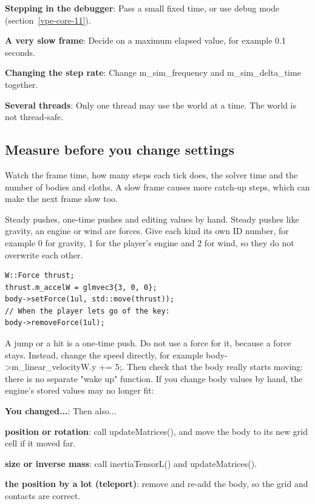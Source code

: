 \documentclass[11pt,a4paper]{article}
\begin{document}
\textbf{Stepping in the debugger}: Pass a small fixed time, or use debug mode (section~\ref{vpe-core-11}).

\textbf{A very slow frame}: Decide on a maximum elapsed value, for example 0.1 seconds.

\textbf{Changing the step rate}: Change m\_sim\_frequency and m\_sim\_delta\_time together.

\textbf{Several threads}: Only one thread may use the world at a time. The world is not thread-safe.

\subsection*{Measure before you change settings}
Watch the frame time, how many steps each tick does, the solver time and the number of bodies and cloths. A slow frame causes more catch-up steps, which can make the next frame slow too.

\label{vpe-core-24}
Steady pushes, one-time pushes and editing values by hand. Steady pushes like gravity, an engine or wind are forces. Give each kind its own ID number, for example 0 for gravity, 1 for the player's engine and 2 for wind, so they do not overwrite each other.

\begin{lstlisting}
W::Force thrust;
thrust.m_accelW = glmvec3{3, 0, 0};
body->setForce(1ul, std::move(thrust));
// When the player lets go of the key:
body->removeForce(1ul);
\end{lstlisting}

A jump or a hit is a one-time push. Do not use a force for it, because a force stays. Instead, change the speed directly, for example body->m\_linear\_velocityW.y += 5;. Then check that the body really starts moving: there is no separate "wake up" function. If you change body values by hand, the engine's stored values may no longer fit:

\textbf{You changed...}: Then also...

\textbf{position or rotation}: call updateMatrices(), and move the body to its new grid cell if it moved far.

\textbf{size or inverse mass}: call inertiaTensorL() and updateMatrices().

\textbf{the position by a lot (teleport)}: remove and re-add the body, so the grid and contacts are correct.
\end{document}

